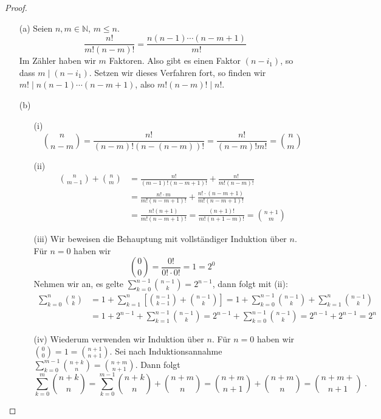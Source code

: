 \begin{proof}
	\begin{enumerate}
		\item[(a)] Seien $n, m \in \mathbb N$, $m \leq n$.
			\[
				\frac{n!}{m! (n-m)!} = \frac{ n (n-1) \cdots (n-m+1)}{m!}
			\]
			Im Zähler haben wir $m$ Faktoren.
			Also gibt es einen Faktor $(n - i_1)$, so dass $m \mid (n-i_1)$.
			Setzen wir dieses Verfahren fort, so finden wir
			$m! \mid n (n-1) \cdots (n-m+1)$, also $m! (n-m)! \mid n!$.
		\item[(b)]
			\begin{enumerate}
				\item[(i)]
					\[
						\binom{n}{n-m} = \frac{n!}{(n-m)! \left( n - (n-m) \right)!}
							= \frac{n!}{(n-m)! m!} = \binom n m
					\]
				\item[(ii)]
					\begin{align*}
						\binom{n}{m-1} + \binom n m 
							&= \frac{n!}{(m-1)! (n-m+1)!} + \frac{n!}{m! (n-m)!} \\
							&= \frac{n! \cdot m}{m! (n-m+1)!} + \frac{n! \cdot (n-m+1)}{m! (n-m+1)!} \\
							&= \frac{n! (n+1)}{m! (n-m+1)!}
							= \frac{(n+1)!}{m! ( n+1-m)!}
							= \binom{n+1}{m}
					\end{align*}
				\item[(iii)]
					Wir beweisen die Behauptung mit vollständiger Induktion über $n$. Für $n=0$
					haben wir
					\[
						\binom 0 0 = \frac{0!}{0! \cdot 0!} = 1 = 2^0
					\]
					Nehmen wir an, es gelte $\sum_{k = 0}^{n-1} \binom{n-1}{k} = 2^{n-1}$, dann folgt mit 
					(ii):
					\begin{align*}
						\sum_{k=0}^n \binom n k 
							&= 1 + \sum_{k=1}^n \left[ \binom{n-1}{k-1} + \binom{n-1}{k} \right]
							= 1 + \sum_{k=0}^{n-1} \binom{n-1}{k} + \sum_{k=1}^n \binom{n-1}{k} \\
							&= 1 + 2^{n-1} + \sum_{k=1}^{n-1} \binom{n-1}{k}
							= 2^{n-1} + \sum_{k=0}^{n-1} \binom{n-1}{k}
							= 2^{n-1} + 2^{n-1} = 2^n
					\end{align*}
				\item[(iv)]
					Wiederum verwenden wir Induktion über $n$. Für $n=0$ haben wir 
					$\binom 0 0 = 1 = \binom{n+1}{n+1}$. Sei nach Induktionsannahme
					$\sum_{k=0}^{m-1} \binom{n+k}{n} = \binom{n+m}{n+1}$.
					Dann folgt
					\[
						\sum_{k=0}^m \binom{n+k}{n}
							= \sum_{k=0}^{m-1} \binom{n+k}{n} + \binom{n+m}{n}
							= \binom{n+m}{n+1} + \binom{n+m}{n}
							= \binom{n+m+}{n+1} \ .
					\]
			\end{enumerate}
	\end{enumerate}
\end{proof}

